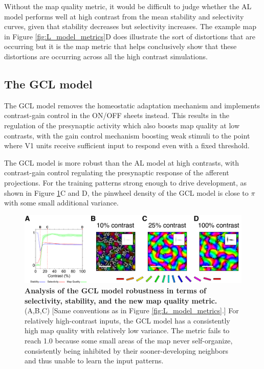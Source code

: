\documentclass[phd,ianc,twoside]{infthesis}
\begin{document}
Without the map quality metric, it would be difficult to judge whether
the AL model performs well at high contrast from the mean stability and
selectivity curves, given that stability decreases but selectivity
increases. The example map in Figure \ref{fig:L_model_metrics}D does
illustrate the sort of distortions that are occurring but it is the map
metric that helps conclusively show that these distortions are occurring
across all the high contrast simulations.

\subsection{The GCL model}

The GCL model removes the homeostatic adaptation mechanism and
implements contrast-gain control in the ON/OFF sheets instead. This
results in the regulation of the presynaptic activity which also boosts
map quality at low contrasts, with the gain control mechanism boosting
weak stimuli to the point where V1 units receive sufficient input to
respond even with a fixed threshold.

The GCL model is more robust than the AL model at high contrasts, with
contrast-gain control regulating the presynaptic response of the
afferent projections. For the training patterns strong enough to drive
development, as shown in Figure \ref{fig:GCL_model_metrics}C and D, the
pinwheel density of the GCL model is close to $\pi$ with some small
additional variance.

\begin{figure}
\centerline{
\includegraphics[width=1\textwidth]{./figures/GCL.pdf}
}
\caption[]{{\bf Analysis of the GCL model robustness in terms of
    selectivity, stability, and the new map quality metric.} (A,B,C)
  [Same conventions as in Figure \ref{fig:L_model_metrics}.]
  For relatively high-contrast inputs, the GCL model has a
  consistently high map quality with relatively low variance. The
  metric fails to reach 1.0 because some small areas of the map never
  self-organize, consistently being inhibited by their
  sooner-developing neighbors and thus unable to learn the input
  patterns.}
\label{fig:GCL_model_metrics}
\end{figure}
\end{document}
